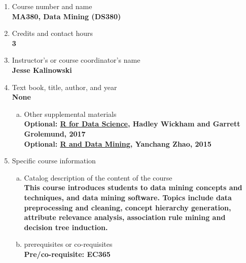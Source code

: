 \label{MA380}  %
\begin{enumerate}[1.]
\item Course number and name\\
  {\bfseries
    MA380, Data Mining (DS380)
  }
  
\item Credits and contact hours\\
  {\bfseries
    3  %
  }

\item Instructor's or course coordinator's name\\
  {\bfseries
    Jesse Kalinowski    
  }

\item Text book, title, author, and year\\
  {\bfseries
    None    
  }
\begin{enumerate}[a.]
\item Other supplemental materials\\
  {\bfseries
    Optional: \href{http://r4ds.had.co.nz}{R for Data Science}, Hadley Wickham and Garrett Grolemund, 2017\\
    Optional: \href{https://www.dropbox.com/s/93un8q75a6xpr9g/RDataMining-book.pdf?dl=0}{R and Data Mining}, Yanchang Zhao, 2015
  }
\end{enumerate}

\item Specific course information
\begin{enumerate}[a.]  
\item Catalog description of the content of the course\\
  {\bfseries
This course introduces students to data mining concepts and techniques, and data mining software. Topics include data preprocessing and cleaning, concept hierarchy generation, attribute relevance analysis, association rule mining and decision tree induction.    
  }

\item prerequisites or co-requisites\\
  {\bfseries
    Pre/co-requisite: EC365
  }


\end{enumerate}
\end{enumerate}

